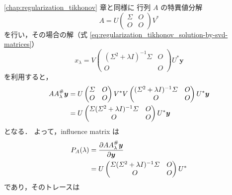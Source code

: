 \ref{chap:regularization_tikhonov} 章と同様に
行列 $A$ の特異値分解
\begin{equation}
    A = U
    \begin{pmatrix}
        \Sigma & O \\
        O      & O
    \end{pmatrix}
    V^*
\end{equation}
を行い，その場合の解（式 \eqref{eq:regularization_tikhonov_solution-by-svd-matrices}）
\begin{equation}
    x_{\lambda} = V
    \begin{pmatrix}
        (\Sigma^2 + \lambda I)^{-1} \Sigma & O \\
        O                                  & O
    \end{pmatrix}
    U^* \bm{y}
\end{equation}
を利用すると，
\begin{align}
    A A_\lambda^\# \bm{y}
     & = U
    \begin{pmatrix}
        \varSigma & O \\
        O      & O
    \end{pmatrix}
    V^* V
    \begin{pmatrix}
        (\varSigma^2 + \lambda I)^{-1} \varSigma & O \\
        O                                  & O
    \end{pmatrix}
    U^* \bm{y}
    \notag \\
     & = U
    \begin{pmatrix}
        \varSigma (\varSigma^2 + \lambda I)^{-1} \varSigma & O \\
        O                                         & O
    \end{pmatrix}
    U^* \bm{y}
\end{align}
となる．
よって，influence matrix は
\begin{align}
    P_A(\lambda)
     & = \frac{\partial A A_\lambda^\# \bm{y}}{\partial \bm{y}}
    \notag                                                      \\
     & = U
    \begin{pmatrix}
        \varSigma (\varSigma^2 + \lambda I)^{-1} \varSigma & O \\
        O                                         & O
    \end{pmatrix}
    U^*
\end{align}
であり，そのトレースは
